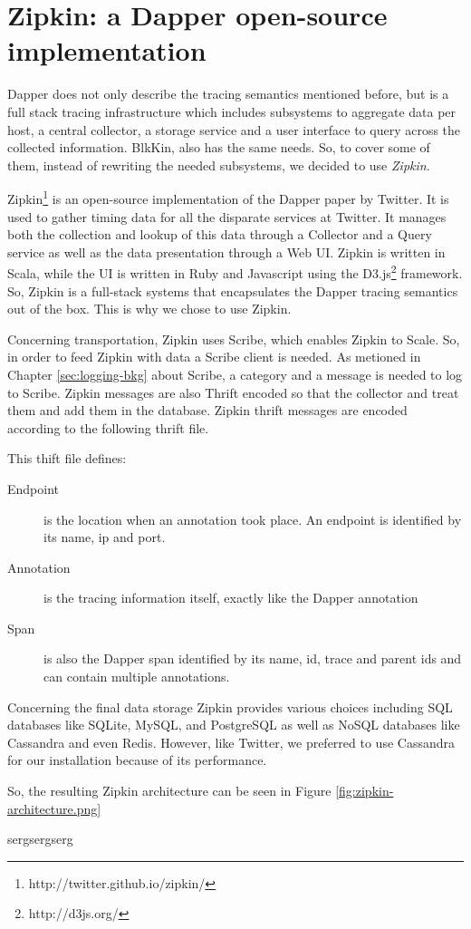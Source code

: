 \section{Zipkin: a Dapper open-source implementation}\label{sec:zipkin}

Dapper does not only describe the tracing semantics mentioned before, but is a
full stack tracing infrastructure which includes subsystems to aggregate data
per host, a central collector, a storage service and a user interface to query
across the collected information. BlkKin, also has the same needs. So, to cover
some of them, instead of rewriting the needed subsystems, we decided to use
\textit{Zipkin}.

Zipkin\footnote{http://twitter.github.io/zipkin/} is an open-source
implementation of the Dapper paper by Twitter. It is used to gather timing data
for all the disparate services at Twitter. It manages both the collection and
lookup of this data through a Collector and a Query service as well as the data
presentation through a Web UI. Zipkin is written in Scala, while the UI is
written in Ruby and Javascript using the D3.js\footnote{http://d3js.org/}
framework. So, Zipkin is a full-stack systems that encapsulates the Dapper
tracing semantics out of the box. This is why we chose to use Zipkin.

Concerning transportation, Zipkin uses Scribe, which enables Zipkin to Scale.
So, in order to feed Zipkin with data a Scribe client is needed. As metioned in
Chapter \ref{sec:logging-bkg} about Scribe, a category and a message is needed
to log to Scribe. Zipkin messages are also Thrift encoded so that the collector
and treat them and add them in the database. Zipkin thrift messages are encoded
according to the following thrift file. 

This thift file defines:

\begin{description}
\item[Endpoint] is the location when an annotation took place. An endpoint is
identified by its name, ip and port.
\item[Annotation] is the tracing information itself, exactly like the Dapper
annotation
\item[Span] is also the Dapper span identified by its name, id, trace and parent
ids and can contain multiple annotations.
\end{description} 

\label{zipkin.thrift}

Concerning the final data storage Zipkin provides various choices including SQL
databases like SQLite, MySQL, and PostgreSQL as well as NoSQL databases like
Cassandra and even Redis. However, like Twitter, we preferred to use Cassandra
for our installation because of its performance.

So, the resulting Zipkin architecture can be seen in Figure
\ref{fig:zipkin-architecture.png}


sergsergserg
